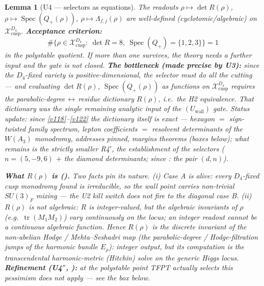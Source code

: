 \documentclass[11pt,a4paper]{article}
\newtheorem{lemma}{Lemma}
\begin{document}
\begin{lemma}[U4 --- selectors as equations]
The readouts $\rho\mapsto\det R(\rho)$, $\rho\mapsto\operatorname{Spec}(Q_+(\rho))$,
$\rho\mapsto\Lambda_{f,j}(\rho)$ are well-defined (cyclotomic/algebraic) on
$\mathcal X_{\mathrm{cusp}}^{D_4}$. \textbf{Acceptance criterion:}
\[
  \#\{\rho\in\mathcal X_{\mathrm{cusp}}^{D_4}:\ \det R=8,\ \operatorname{Spec}(Q_+)=\{1,2,3\}\}=1
\]
in the polystable quotient. If more than one survives, the theory needs a further input and the gate is
\emph{not} closed. \textbf{The bottleneck (made precise by U3):} since the $D_4$-fixed variety is
positive-dimensional, the \emph{selector} must do all the cutting --- and evaluating $\det R(\rho)$,
$\operatorname{Spec}(Q_+(\rho))$ as functions on $\mathcal X_{\mathrm{cusp}}^{D_4}$ requires the
\emph{parabolic-degree\,$\leftrightarrow$\,residue dictionary} $R(\rho)$, i.e.\ the H2 equivalence. That
dictionary was the single remaining analytic input of the $(U_{\mathrm{wall}})$ gate. \emph{Status update:
since \vref{v118}--\vref{v122} the dictionary itself is exact} --- hexagon $=$ sign-twisted family spectrum, lepton
coefficients $=$ resolvent determinants of the $W(A_3)$ monodromy, addresses pinned, margins theorems
(boxes below); what remains is the strictly smaller R4$'$, the \emph{establishment of the selectors}
($n=(5,-9,6)$ $+$ the diamond determinants; since : the pair $(d,n)$).

\textbf{What $R(\rho)$ is ().} Two facts pin its nature. \emph{(i) Case A is
alive:} every $D_4$-fixed cusp monodromy found is \emph{irreducible}, so the wall point carries
non-trivial $SU(3)_F$ mixing --- the U2 kill switch does \emph{not} fire to the diagonal case B.
\emph{(ii) $R(\rho)$ is not algebraic:} $R$ is integer-valued, but the algebraic invariants of $\rho$
(e.g.\ $\operatorname{tr}(M_1M_2)$) vary \emph{continuously} on the locus; an integer readout cannot be a
continuous algebraic function. Hence $R(\rho)$ is the discrete invariant of the \emph{non-abelian Hodge /
Mehta--Seshadri} map (the parabolic-degree / Hodge-filtration jumps of the harmonic bundle $E_\rho$):
integer output, but its \emph{computation} is the transcendental harmonic-metric (Hitchin) solve \emph{on
the generic Higgs locus}. \textbf{Refinement (U4$''$, ):} at the
\emph{polystable} point TFPT actually selects this pessimism does not apply --- see the box below.
\end{lemma}
\end{document}
